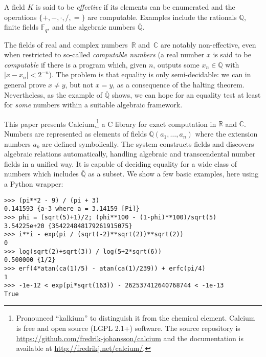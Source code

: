 \documentclass[sigconf,screen,urlbreakonhyphens]{acmart}
\begin{document}
A field $K$ is said to be \emph{effective}
if its elements can be enumerated
and the operations $\{+, -, \cdot, /, =\}$
are computable.
Examples include the rationals $\mathbb{Q}$, finite fields $\mathbb{F}_q$,
and the algebraic numbers $\overline{\mathbb{Q}}$.

The fields of real and complex numbers~$\mathbb{R}$ and~$\mathbb{C}$
are notably non-effective, even 
when restricted to so-called \emph{computable numbers}
(a real number $x$ is said to be \emph{computable} if
there is a program
which, given $n$, outputs some $x_n \in \mathbb{Q}$ with $|x - x_n| < 2^{-n}$).
The problem is that equality is only semi-decidable: we can in general prove $x \ne y$,
but not $x = y$, as a consequence of the halting theorem.
Nevertheless,
as the example of $\overline{\mathbb{Q}}$ shows,
we can hope for an equality test at least for \emph{some} numbers
within a suitable algebraic framework.

This paper presents Calcium,\footnote{Pronounced ``kalkium'' to distinguish it from
the chemical element. Calcium is free and open source
(LGPL 2.1+) software. The source repository is
\url{https://github.com/fredrik-johansson/calcium} and
the documentation is available at \url{http://fredrikj.net/calcium/}.} a C library
for exact computation in $\mathbb{R}$ and $\mathbb{C}$.
Numbers are represented as elements of fields
$\mathbb{Q}(a_1,\ldots,a_n)$ where the extension numbers $a_k$
are defined symbolically.
The system constructs fields and discovers algebraic relations
automatically,
handling algebraic and transcendental number fields in a unified way.
It is capable of deciding equality
for a wide class of numbers
which includes $\overline{\mathbb{Q}}$ as a subset.
We show a few basic examples, here using a Python wrapper:

\begin{small}
\begin{verbatim}
>>> (pi**2 - 9) / (pi + 3)
0.141593 {a-3 where a = 3.14159 [Pi]}
>>> phi = (sqrt(5)+1)/2; (phi**100 - (1-phi)**100)/sqrt(5)
3.54225e+20 {354224848179261915075}
>>> i**i - exp(pi / (sqrt(-2)**sqrt(2))**sqrt(2))
0
>>> log(sqrt(2)+sqrt(3)) / log(5+2*sqrt(6))
0.500000 {1/2}
>>> erf(4*atan(ca(1)/5) - atan(ca(1)/239)) + erfc(pi/4)
1
>>> -1e-12 < exp(pi*sqrt(163)) - 262537412640768744 < -1e-13
True
\end{verbatim}
\end{small}

\end{document}
